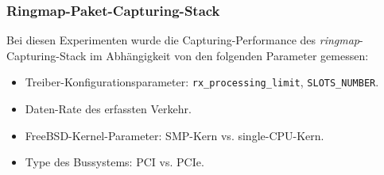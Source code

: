 \subsubsection{Ringmap-Paket-Capturing-Stack}\label{sec:erg_ringmap_stack}
Bei diesen Experimenten wurde die Capturing-Performance des \emph{ringmap}-Capturing-Stack
im Abhängigkeit von den folgenden Parameter gemessen: 
\begin{itemize}
	\item Treiber-Konfigurationsparameter: \verb+rx_processing_limit+, \verb+SLOTS_NUMBER+.
	\item Daten-Rate des erfassten Verkehr.
	\item FreeBSD-Kernel-Parameter: SMP-Kern vs. single-CPU-Kern.
	\item Type des Bussystems: PCI vs. PCIe.
\end{itemize}

